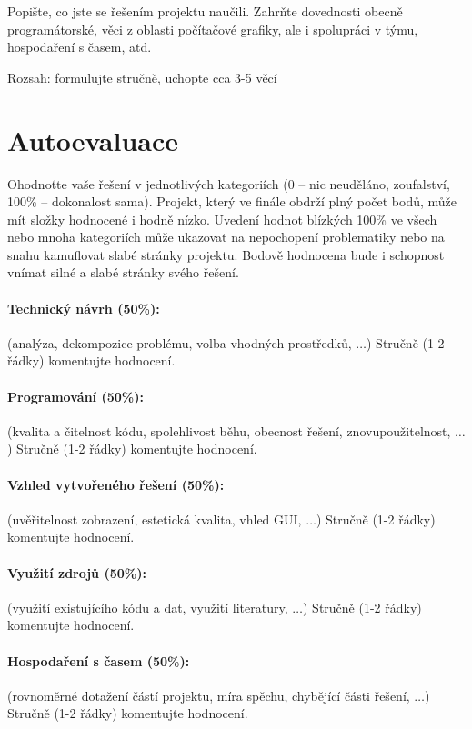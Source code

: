 \documentclass[11pt,a4paper]{article}
\begin{document}
Popište, co jste se řešením projektu naučili. Zahrňte dovednosti obecně
programátorské, věci z oblasti počítačové grafiky, ale i spolupráci v týmu,
hospodaření s časem, atd.

Rozsah: formulujte stručně, uchopte cca 3-5 věcí

\section{Autoevaluace}

Ohodnoťte vaše řešení v jednotlivých kategoriích (0 – nic neuděláno,
zoufalství, 100\% – dokonalost sama). Projekt, který ve finále obdrží plný
počet bodů, může mít složky hodnocené i hodně nízko. Uvedení hodnot blízkých
100\% ve všech nebo mnoha kategoriích může ukazovat na nepochopení problematiky
nebo na snahu kamuflovat slabé stránky projektu. Bodově hodnocena bude i
schopnost vnímat silné a slabé stránky svého řešení.

\paragraph{Technický návrh (50\%):} (analýza, dekompozice problému, volba
vhodných prostředků, $\ldots$)
Stručně (1-2 řádky) komentujte hodnocení.

\paragraph{Programování (50\%):} (kvalita a čitelnost kódu, spolehlivost běhu,
obecnost řešení, znovupoužitelnost, $\ldots$)
Stručně (1-2 řádky) komentujte hodnocení.

\paragraph{Vzhled vytvořeného řešení (50\%):} (uvěřitelnost zobrazení,
estetická kvalita, vhled GUI, $\ldots$)
Stručně (1-2 řádky) komentujte hodnocení.

\paragraph{Využití zdrojů (50\%):} (využití existujícího kódu a dat, využití
literatury, $\ldots$)
Stručně (1-2 řádky) komentujte hodnocení.

\paragraph{Hospodaření s časem (50\%):} (rovnoměrné dotažení částí projektu,
míra spěchu, chybějící části řešení, $\ldots$)
Stručně (1-2 řádky) komentujte hodnocení.
\end{document}
